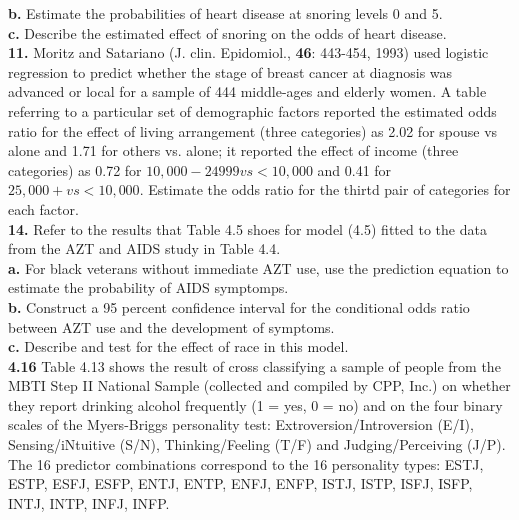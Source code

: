 \documentclass[paper=letter, fontsize=11pt]{scrartcl} %
\begin{document}
\textbf{b.} Estimate the probabilities of heart disease at snoring levels 0 and 5. \\

\textbf{c.} Describe the estimated effect of snoring on the odds of heart disease. \\

\textbf{11.} Moritz and Satariano (J. clin. Epidomiol., \textbf{46}: 443-454, 1993) used
logistic regression to predict whether the stage of breast cancer at diagnosis was 
advanced or local for a sample of 444 middle-ages and elderly women. A table referring to
a particular set of demographic factors reported the estimated odds ratio for the effect 
of living arrangement (three categories) as 2.02 for spouse vs alone and 1.71 for others
vs. alone; it reported the effect of income (three categories) as 0.72 for 
$10,000-24999 vs < 10,000$ and 0.41 for $25,000+ vs < 10,000$. Estimate the odds ratio 
for the thirtd pair of categories for each factor. \\

\textbf{14.} Refer to the results that Table 4.5 shoes for model (4.5) fitted to the data
from the AZT and AIDS study in Table 4.4. \\

\textbf{a.} For black veterans without immediate AZT use, use the prediction equation to 
estimate the probability of AIDS symptomps. \\

\textbf{b.} Construct a 95 percent confidence interval for the conditional odds ratio 
between AZT use and the development of symptoms. \\

\textbf{c.} Describe and test for the effect of race in this model. \\

\textbf{4.16} Table 4.13 shows the result of cross classifying a sample of people from 
the MBTI Step II National Sample (collected and compiled by CPP, Inc.) on whether they 
report drinking alcohol frequently (1 = yes, 0 = no) and on the four binary scales of 
the Myers-Briggs personality test: Extroversion/Introversion (E/I), Sensing/iNtuitive 
(S/N), Thinking/Feeling (T/F) and Judging/Perceiving (J/P). The 16 predictor combinations
correspond to the 16 personality types: ESTJ, ESTP, ESFJ, ESFP, ENTJ, ENTP, ENFJ, ENFP,
ISTJ, ISTP, ISFJ, ISFP, INTJ, INTP, INFJ, INFP. \\
\end{document}
